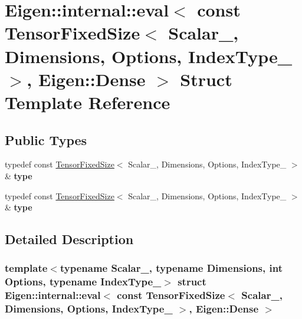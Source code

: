 \hypertarget{struct_eigen_1_1internal_1_1eval_3_01const_01_tensor_fixed_size_3_01_scalar___00_01_dimensions_0f43ed21765264e2b54d64ee38264752a}{}\section{Eigen\+:\+:internal\+:\+:eval$<$ const Tensor\+Fixed\+Size$<$ Scalar\+\_\+, Dimensions, Options, Index\+Type\+\_\+ $>$, Eigen\+:\+:Dense $>$ Struct Template Reference}
\label{struct_eigen_1_1internal_1_1eval_3_01const_01_tensor_fixed_size_3_01_scalar___00_01_dimensions_0f43ed21765264e2b54d64ee38264752a}
\subsection*{Public Types}
\begin{DoxyCompactItemize}
\item 
\mbox{\label{struct_eigen_1_1internal_1_1eval_3_01const_01_tensor_fixed_size_3_01_scalar___00_01_dimensions_0f43ed21765264e2b54d64ee38264752a_a59d3a3315e4bcf810bf0ce3c7b326b1c}} 
typedef const \hyperlink{class_eigen_1_1_tensor_fixed_size}{Tensor\+Fixed\+Size}$<$ Scalar\+\_\+, Dimensions, Options, Index\+Type\+\_\+ $>$ \& {\bfseries type}
\item 
\mbox{\label{struct_eigen_1_1internal_1_1eval_3_01const_01_tensor_fixed_size_3_01_scalar___00_01_dimensions_0f43ed21765264e2b54d64ee38264752a_a59d3a3315e4bcf810bf0ce3c7b326b1c}} 
typedef const \hyperlink{class_eigen_1_1_tensor_fixed_size}{Tensor\+Fixed\+Size}$<$ Scalar\+\_\+, Dimensions, Options, Index\+Type\+\_\+ $>$ \& {\bfseries type}
\end{DoxyCompactItemize}


\subsection{Detailed Description}
\subsubsection*{template$<$typename Scalar\+\_\+, typename Dimensions, int Options, typename Index\+Type\+\_\+$>$\newline
struct Eigen\+::internal\+::eval$<$ const Tensor\+Fixed\+Size$<$ Scalar\+\_\+, Dimensions, Options, Index\+Type\+\_\+ $>$, Eigen\+::\+Dense $>$}



